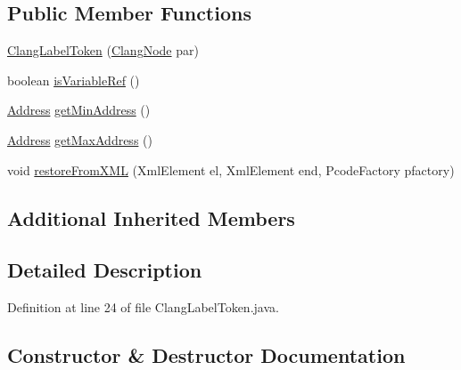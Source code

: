 \subsection*{Public Member Functions}
\begin{DoxyCompactItemize}
\item 
\mbox{\hyperlink{classghidra_1_1app_1_1decompiler_1_1_clang_label_token_a5e1cb3125d25fb20a7bcb51a3ae94a55}{Clang\+Label\+Token}} (\mbox{\hyperlink{interfaceghidra_1_1app_1_1decompiler_1_1_clang_node}{Clang\+Node}} par)
\item 
boolean \mbox{\hyperlink{classghidra_1_1app_1_1decompiler_1_1_clang_label_token_ae73b1f5b02f99f359edec0179c67cd5f}{is\+Variable\+Ref}} ()
\item 
\mbox{\hyperlink{class_address}{Address}} \mbox{\hyperlink{classghidra_1_1app_1_1decompiler_1_1_clang_label_token_a077f85f65075e08fbd1a566bd4ada277}{get\+Min\+Address}} ()
\item 
\mbox{\hyperlink{class_address}{Address}} \mbox{\hyperlink{classghidra_1_1app_1_1decompiler_1_1_clang_label_token_a95af920ece03bd91e20d1dd7e7012512}{get\+Max\+Address}} ()
\item 
void \mbox{\hyperlink{classghidra_1_1app_1_1decompiler_1_1_clang_label_token_adb177bbc81757c1491730c834ada7179}{restore\+From\+X\+ML}} (Xml\+Element el, Xml\+Element end, Pcode\+Factory pfactory)
\end{DoxyCompactItemize}
\subsection*{Additional Inherited Members}


\subsection{Detailed Description}


Definition at line 24 of file Clang\+Label\+Token.\+java.



\subsection{Constructor \& Destructor Documentation}
\mbox{\label{classghidra_1_1app_1_1decompiler_1_1_clang_label_token_a5e1cb3125d25fb20a7bcb51a3ae94a55}} 
